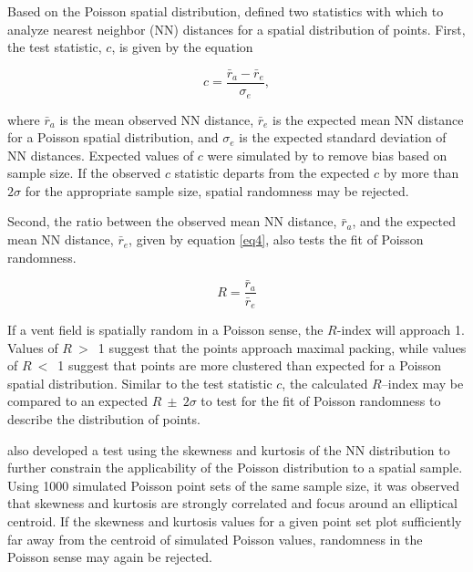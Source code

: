 Based on the Poisson spatial distribution, \citet{Clark1954} defined two statistics with which to analyze nearest neighbor (NN) distances for a spatial distribution of points. First, the test statistic, $c$, is given by the equation \begin{linenomath*}\begin{equation}
c= \frac{\bar{r}_a -\bar{r}_e}{\sigma_e},  \label{eq3}
\end{equation}\end{linenomath*}where $\bar{r}_a$ is the mean observed NN distance, $\bar{r}_e$ is the expected mean NN distance for a Poisson spatial distribution, and $\sigma_e$ is the expected standard deviation of NN distances. Expected values of $c$ were simulated by \citet{Baloga2007} to remove bias based on sample size. If the observed $c$ statistic departs from the expected $c$ by more than $2\sigma$ for the appropriate sample size, spatial randomness may be rejected.

Second, the ratio between the observed mean NN distance, $\bar{r}_a$, and the expected mean NN distance, $\bar{r}_e$, given by equation \ref{eq4}, also tests the fit of Poisson randomness.\begin{linenomath*}\begin{equation}
R = \frac{\bar{r}_a}{\bar{r}_e} \label{eq4}
\end{equation}\end{linenomath*}
If a vent field is spatially random in a Poisson sense, the $R$-index will approach 1. Values of $R~>$~1 suggest that the points approach maximal packing, while values of $R~<$~1 suggest that points are more clustered than expected for a Poisson spatial distribution. Similar to the test statistic $c$, the calculated $R$--index may be compared to an expected $R~\pm~2\sigma$ to test for the fit of Poisson randomness to describe the distribution of points.

\citet{Baloga2007} also developed a test using the skewness and kurtosis of the NN distribution to further constrain the applicability of the Poisson distribution to a spatial sample. Using 1000 simulated Poisson point sets of the same sample size, it was observed that skewness and kurtosis are strongly correlated and focus around an elliptical centroid.  If the skewness and kurtosis values for a given point set plot sufficiently far away from the centroid of simulated Poisson values, randomness in the Poisson sense may again be rejected.

